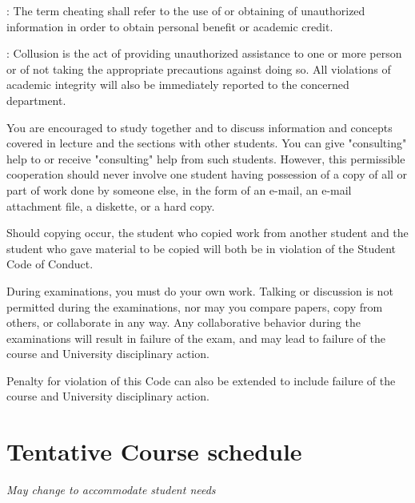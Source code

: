\documentclass[a4paper]{article}
\begin{document}
: The term cheating shall refer to the use of or obtaining of unauthorized information in order to obtain personal benefit or academic credit. 

: Collusion is the act of providing unauthorized assistance to one or more person or of not taking the appropriate precautions against doing so. 
All violations of academic integrity will also be immediately reported to the concerned department.  

You are encouraged to study together and to discuss information and concepts covered in lecture and the sections with other students. You can give "consulting" help to or receive "consulting" help from such students. However, this permissible cooperation should never involve one student having possession of a copy of all or part of work done by someone else, in the form of an e-mail, an e-mail attachment file, a diskette, or a hard copy. 

Should copying occur, the student who copied work from another student and the student who gave material to be copied will both be in violation of the Student Code of Conduct. 

During examinations, you must do your own work. Talking or discussion is not permitted during the examinations, nor may you compare papers, copy from others, or collaborate in any way. Any collaborative behavior during the examinations will result in failure of the exam, and may lead to failure of the course and University disciplinary action.

Penalty for violation of this Code can also be extended to include failure of the course and University disciplinary action. 


\section{Tentative Course schedule}
{\it May change to accommodate student needs}\\
\end{document}
